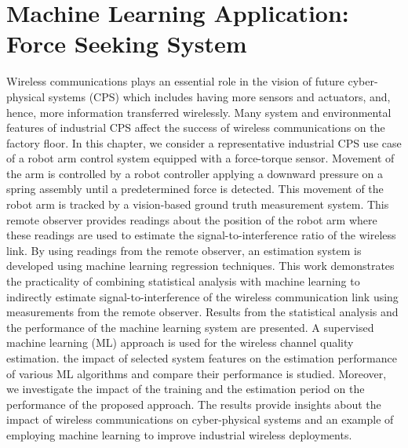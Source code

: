 
\chapter{Machine Learning Application: Force Seeking System}\label{chapter:ftml}

	
\chapterintro*
Wireless communications plays an essential role in the vision of future cyber-physical systems (CPS) which includes having more sensors and actuators, and, hence, more information transferred wirelessly. Many system and environmental features of industrial CPS affect the success of wireless communications on the factory floor. In this chapter, we consider a representative industrial CPS use case of a robot arm control system equipped with a force-torque sensor. Movement of the arm is controlled by a robot controller applying a downward pressure on a spring assembly until a predetermined force is detected. This movement of the robot arm is tracked by a vision-based ground truth measurement system. This remote observer provides readings about the position of the robot arm where these readings are used to estimate the signal-to-interference ratio of the wireless link. By using readings from the remote observer, an estimation system is developed using machine learning regression techniques.  This work demonstrates the practicality of combining statistical analysis with machine learning to indirectly estimate signal-to-interference of the wireless communication link using measurements from the remote observer.  Results from the statistical analysis and the performance of the machine learning system are presented.  A supervised machine learning (ML) approach is used for the wireless channel quality estimation. the impact of selected system features on the estimation performance of various ML algorithms and compare their performance is studied.  Moreover, we investigate the impact of the training and the estimation period on the performance of the proposed approach. The results provide insights about the impact of wireless communications on cyber-physical systems and an example of employing machine learning to improve industrial wireless deployments. 


	
